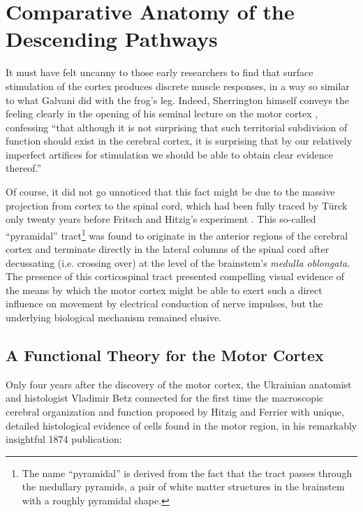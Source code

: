 \section{Comparative Anatomy of the Descending Pathways}

It must have felt uncanny to those early researchers to find that surface stimulation of the cortex produces discrete muscle responses, in a way so similar to what Galvani did with the frog's leg. Indeed, Sherrington himself conveys the feeling clearly in the opening of his seminal lecture on the motor cortex \cite[p.271]{Sherrington1906}, confessing ``that although it is not surprising that such territorial subdivision of function should exist in the cerebral cortex, it is surprising that by our relatively imperfect artifices for stimulation we should be able to obtain clear evidence thereof.''

Of course, it did not go unnoticed that this fact might be due to the massive projection from cortex to the spinal cord, which had been fully traced by Türck only twenty years before Fritsch and Hitzig's experiment \cite{Nathan1955}. This so-called ``pyramidal'' tract\footnote{The name ``pyramidal'' is derived from the fact that the tract passes through the medullary pyramids, a pair of white matter structures in the brainstem with a roughly pyramidal shape.} was found to originate in the anterior regions of the cerebral cortex and terminate directly in the lateral columns of the spinal cord after decussating (i.e. crossing over) at the level of the brainstem's \emph{medulla oblongata}. The presence of this corticospinal tract presented compelling visual evidence of the means by which the motor cortex might be able to exert such a direct influence on movement by electrical conduction of nerve impulses, but the underlying biological mechanism remained elusive.

\subsection{A Functional Theory for the Motor Cortex}

Only four years after the discovery of the motor cortex, the Ukrainian anatomist and histologist Vladimir Betz connected for the first time the macroscopic cerebral organization and function proposed by Hitzig and Ferrier with unique, detailed histological evidence of cells found in the motor region, in his remarkably insightful 1874 publication:

